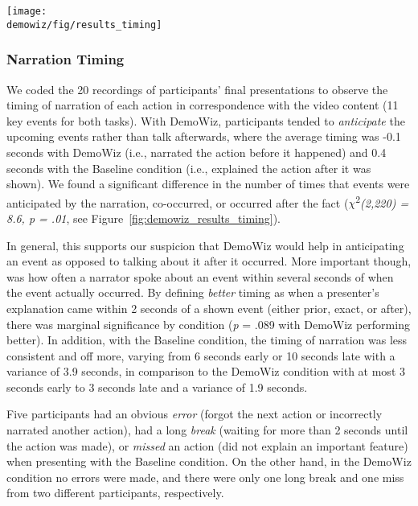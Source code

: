 \begin{figure*}[b!]
  \centering
  \texttt{[image: \\demowiz/fig/results\_timing]}
  \caption{The number of times events were anticipated by the narration, co-occurred, or occurred after the fact.}
  \label{fig:demowiz_results_timing}
\end{figure*}

\subsubsection{Narration Timing}
We coded the 20 recordings of participants' final presentations to observe the timing of narration of each action in correspondence with the video content (11 key events for both tasks). With DemoWiz, participants tended to \textit{anticipate} the upcoming events rather than talk afterwards, where the average timing was -0.1 seconds with DemoWiz (i.e., narrated the action before it happened) and 0.4 seconds with the Baseline condition (i.e., explained the action after it was shown). We found a significant difference in the number of times that events were anticipated by the narration, co-occurred, or occurred after the fact ($\chi $\textsuperscript{2}\textit{(2,220) = 8.6, p = .01}, see Figure~\ref{fig:demowiz_results_timing}).

In general, this supports our suspicion that DemoWiz would help in anticipating an event as opposed to talking about it after it occurred. More important though, was how often a narrator spoke about an event within several seconds of when the event actually occurred. By defining \textit{better} timing as when a presenter's explanation came within 2 seconds of a shown event (either prior, exact, or after), there was marginal significance by condition (\textit{p} = .089 with DemoWiz performing better). In addition, with the Baseline condition, the timing of narration was less consistent and off more, varying from 6 seconds early or 10 seconds late with a variance of 3.9 seconds, in comparison to the DemoWiz condition with at most 3 seconds early to 3 seconds late and a variance of 1.9 seconds.

Five participants had an obvious \textit{error} (forgot the next action or incorrectly narrated another action), had a long \textit{break} (waiting for more than 2 seconds until the action was made), or \textit{missed} an action (did not explain an important feature) when presenting with the Baseline condition. On the other hand, in the DemoWiz condition no errors were made, and there were only one long break and one miss from two different participants, respectively.

